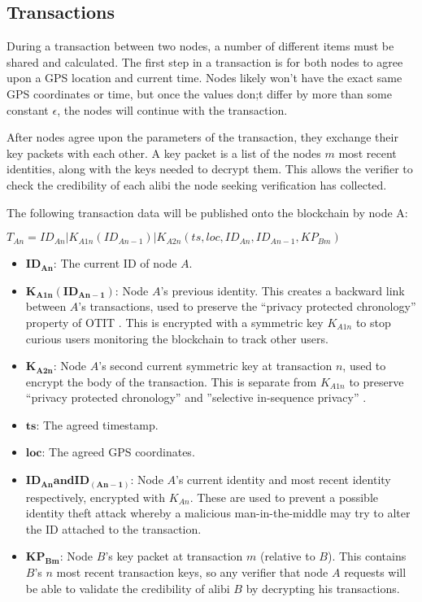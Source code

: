 \documentclass[12pt]{article}
\begin{document}
\subsection{Transactions}
During a transaction between two nodes, a number of different items must be shared and calculated. The first step in a transaction is for both nodes to agree upon a GPS location and current time. Nodes likely won't have the exact same GPS coordinates or time, but once the values don;t differ by more than some constant $\epsilon$, the nodes will continue with the transaction.

After nodes agree upon the parameters of the transaction, they exchange their key packets with each other. A key packet is a list of the nodes $m$ most recent identities, along with the keys needed to decrypt them. This allows the verifier to check the credibility of each alibi the node seeking verification has collected.

The following transaction data will be published onto the blockchain by node A:

$T_{An} = ID_{An} | K_{A1n}(ID_{An-1}) | K_{A2n}(ts, loc, ID_{An}, ID_{An-1}, KP_{Bm})$

\begin{itemize}
	\item[] $\mathbf{ID_{An}}$: The current ID of node $A$.
	\item[] $\mathbf{K_{A1n}(ID_{An-1})}$: Node $A$'s previous identity. This creates a backward link between $A$'s transactions, used to preserve the ``privacy protected chronology'' property of OTIT \cite{otit}. This is encrypted with a symmetric key $K_{A1n}$ to stop curious users monitoring the blockchain to track other users.
	\item[] $\mathbf{K_{A2n}}$: Node $A$'s second current symmetric key at transaction $n$, used to encrypt the body of the transaction. This is separate from $K_{A1n}$ to preserve ``privacy protected chronology'' and ''selective in-sequence privacy'' \cite{otit}. 
	\item[] $\mathbf{ts}$: The agreed timestamp.
	\item[] $\mathbf{loc}$: The agreed GPS coordinates.
	\item[] $\mathbf{ID_{An} and ID_(An-1)}$:  Node $A$'s current identity and most recent identity respectively, encrypted with $K_{An}$. These are used to prevent a possible identity theft attack whereby a malicious man-in-the-middle may try to alter the ID attached to the transaction.
	\item[] $\mathbf{KP_{Bm}}$: Node $B$'s key packet at transaction $m$ (relative to $B$). This contains $B$'s $n$ most recent transaction keys, so any verifier that node $A$ requests will be able to validate the credibility of alibi $B$ by decrypting his transactions. 
\end{itemize}
\end{document}
